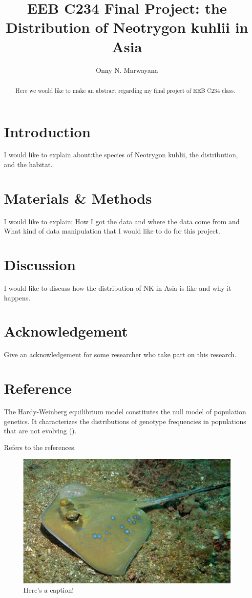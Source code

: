 \documentclass[12pt]{article}
\title{EEB C234 Final Project: the Distribution of Neotrygon kuhlii in Asia}
\author{Onny N. Marwayana}
\date{}
\begin{document}
\maketitle
\begin{abstract}
Here we would like to make an abstract regarding my final project of EEB C234 class.
\end{abstract}
\section{Introduction}
I would like to explain about:the species of Neotrygon kuhlii, the distribution, and the habitat.
\section{Materials \& Methods}
I would like to explain: How I got the data and where the data come from and What kind of data manipulation that I would like to do for this project.
\section{Discussion}
I would like to discuss how the distribution of NK in Asia is like and why it happens.
\section{Acknowledgement}
Give an acknowledgement for some researcher who take part on this research.
\section{Reference}
The Hardy-Weinberg equilibrium model constitutes the null model of population genetics. It characterizes the distributions of genotype frequencies in populations that are not evolving (\cite{Hardy1908, Weinberg1908}).




Refers to the references.

\begin{figure}
  \label{fig:pop}
\begin{center}
 \includegraphics[width=0.5\linewidth]{Blue-spotted_Stingray_(Neotrygon_kuhlii)_(8465011759).jpg}
\end{center}
\caption{Here's a caption!}

 \end{figure}
\end{document}
